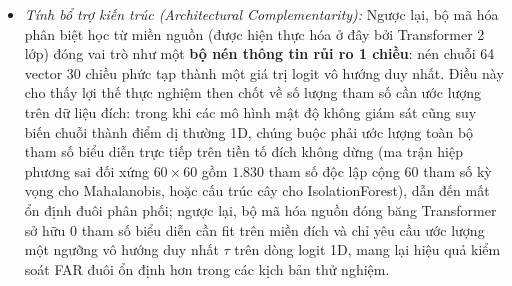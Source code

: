 \documentclass[12pt, a4paper, reqno, oneside]{book}
\begin{document}
\begin{itemize}
    \item \textit{Tính bổ trợ kiến trúc (Architectural Complementarity):} Ngược lại, bộ mã hóa phân biệt học từ miền nguồn (được hiện thực hóa ở đây bởi Transformer 2 lớp) đóng vai trò như một \textbf{bộ nén thông tin rủi ro 1 chiều}: nén chuỗi 64 vector 30 chiều phức tạp thành một giá trị logit vô hướng duy nhất. Điều này cho thấy lợi thế thực nghiệm then chốt về số lượng tham số cần ước lượng trên dữ liệu đích: trong khi các mô hình mật độ không giám sát cũng suy biến chuỗi thành điểm dị thường 1D, chúng buộc phải ước lượng toàn bộ tham số biểu diễn trực tiếp trên tiền tố đích không dừng (ma trận hiệp phương sai đối xứng $60 \times 60$ gồm $1.830$ tham số độc lập cộng $60$ tham số kỳ vọng cho Mahalanobis, hoặc cấu trúc cây cho IsolationForest), dẫn đến mất ổn định đuôi phân phối; ngược lại, bộ mã hóa nguồn đóng băng Transformer sở hữu $0$ tham số biểu diễn cần fit trên miền đích và chỉ yêu cầu ước lượng một ngưỡng vô hướng duy nhất $\tau$ trên dòng logit 1D, mang lại hiệu quả kiểm soát FAR đuôi ổn định hơn trong các kịch bản thử nghiệm.
\end{itemize}
\end{document}
